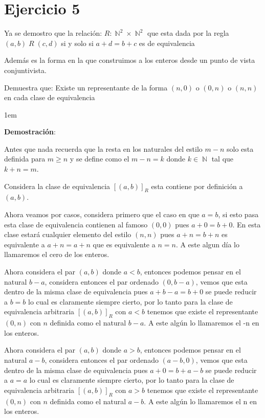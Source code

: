 \documentclass[12pt, fleqn]{article}                             %
\newenvironment{SmallIndentation}[1][0.75em]                    %
    {\begin{adjustwidth}{#1}{}\begin{footnotesize}}                 %
    {\end{footnotesize}\end{adjustwidth}}                           %
\DeclareMathOperator \Naturals  {\mathbb{N}}                     %
\begin{document}
\section{Ejercicio 5}

    Ya se demostro que la relación: $R: \Naturals^2 \times \Naturals^2$ que esta dada por la regla
    $(a, b) \; R \; (c, d)$ si y solo si $a+d = b+c$ es de equivalencia

    Además es la forma en la que construimos a los enteros desde un punto de vista conjuntivista.

    Demuestra que: Existe un representante de la forma $(n, 0)$ o $(0, n)$ o $(n,n)$ en cada
    clase de equivalencia

    \begin{SmallIndentation}[1em]
        \textbf{Demostración}:

        Antes que nada recuerda que la resta en los naturales del estilo $m-n$ solo esta definida
        para $m \geq n$ y se define como el $m-n = k$ donde $k \in \Naturals$ tal que $k+n=m$.

        Considera la clase de equivalencia $[(a, b)]_R$ esta contiene por definición a $(a,b)$.

        Ahora veamos por casos, considera primero que el caso en que $a=b$, si esto pasa esta clase
        de equivalencia contienen al famoso $(0,0)$ pues $a+0=b+0$. En esta clase estará cualquier
        elemento del estilo $(n, n)$ pues $a+n=b+n$ es equivalente a $a+n=a+n$ que es equivalente a $n=n$.
        A este algun día lo llamaremos el cero de los enteros.

        Ahora considera el par $(a,b)$ donde $a<b$, entonces podemos pensar en el natural $b-a$, considera
        entonces el par ordenado $(0, b-a)$, vemos que esta dentro de la misma clase de equivalencia pues
        $a+b-a=b+0$ se puede reducir a $b=b$ lo cual es claramente siempre cierto, por lo tanto
        para la clase de equivalencia arbitraria $[(a, b)]_R$ con $a<b$ tenemos que existe el representante
        $(0, n)$ con $n$ definida como el natural $b-a$. A este algún lo llamaremos el -n en los enteros.

        Ahora considera el par $(a,b)$ donde $a>b$, entonces podemos pensar en el natural $a-b$, considera
        entonces el par ordenado $(a-b, 0)$, vemos que esta dentro de la misma clase de equivalencia pues
        $a+0=b+a-b$ se puede reducir a $a=a$ lo cual es claramente siempre cierto, por lo tanto
        para la clase de equivalencia arbitraria $[(a, b)]_R$ con $a>b$ tenemos que existe el representante
        $(0, n)$ con $n$ definida como el natural $a-b$. A este algún lo llamaremos el n en los enteros.

    \end{SmallIndentation}
                
\end{document}
